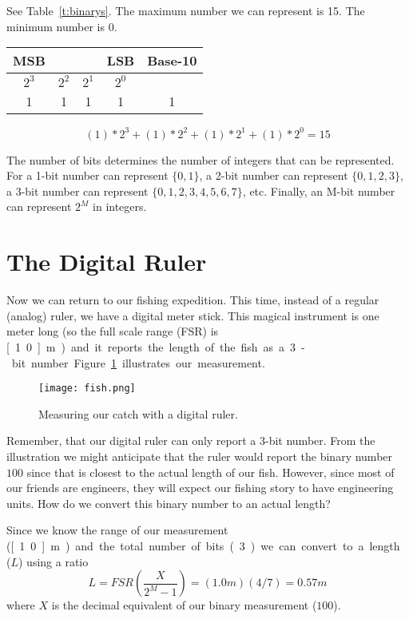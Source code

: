 \begin{soln}
See Table~\ref{t:binarys}.  The maximum number we can represent is 15.  The minimum number is 0.
\begin{table*}[bt!] 
\renewcommand{\arraystretch}{1.2}
\caption{Solution}
\label{t:binarys}
\centering
\begin{tabular}{|c|c|c|c||c|}\hline
MSB &\hspace{4ex} & \hspace{4ex}& LSB & Base-10\\ \hline \hline
$2^3$ & $2^2$ & $2^1$ & $2^0$ & \\ \hline \hline
1 & 1 & 1 & 1 & 1 \\ \hline
\end{tabular}
\end{table*}
\[ (1)*2^3+(1)*2^2+(1)*2^1+(1)*2^0 = 15 \]

\end{soln}

\fi


The number of bits determines the number of integers that can be represented.  For a 1-bit number can represent $\{0,1\}$, a 2-bit number can represent $\{0,1,2,3\}$, a 3-bit number can represent $\{0,1,2,3,4,5,6,7\}$, etc.  Finally, an M-bit number can represent $2^M$ in integers.  

\section{The Digital Ruler}
Now we can return to our fishing expedition.  This time, instead of a regular (analog) ruler, we have a digital meter stick.  This magical instrument is one meter long (so the full scale range (FSR) is \unit[1.0]{m}) and it reports the length of the fish as a 3-bit number.  Figure~\ref{f:fish} illustrates our measurement.
\begin{figure}[hbt!]
\centering
\texttt{[image: fish.png]}
\caption{Measuring our catch with a digital ruler.}
\label{f:fish}
\end{figure}

Remember, that our digital ruler can only report a 3-bit number.  From the illustration we might anticipate that the ruler would report the binary number $100$ since that is closest to the actual length of our fish.  However, since most of our friends are engineers, they will expect our fishing story to have engineering units.  How do we convert this binary number to an actual length?

Since we know the range of our measurement (\unit[1.0]{m}) and the total number of bits (3) we can convert to a length ($L$) using a ratio
\begin{equation}
L = FSR \left(\frac{X}{2^M - 1}\right
) = (1.0 m)(4/7) = 0.57 m
\end{equation}
where $X$ is the decimal equivalent of our binary measurement ($100$).  

